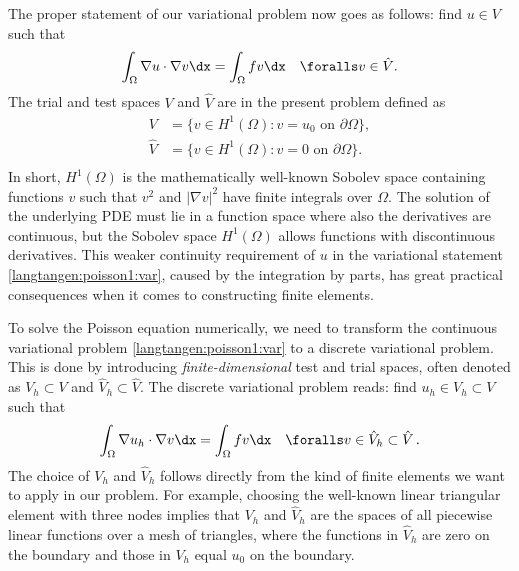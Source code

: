The proper statement of
our variational problem now goes as follows:
find $u \in V$ such that
\begin{equation} \label{langtangen:poisson1:var}
  \int_{\Omega} \nabla u \cdot \nabla v \dx =
  \int_{\Omega} fv \dx
  \quad \foralls v \in \hat{V}.
\end{equation}
The trial and test spaces $V$ and $\hat{V}$ are in the present
problem defined as
\begin{equation}
  \begin{split}
     V      &= \{v \in H^1(\Omega) : v = u_0 \mbox{ on } \partial\Omega\}, \\
    \hat{V} &= \{v \in H^1(\Omega) : v = 0 \mbox{ on } \partial\Omega\}. \\
  \end{split}
\end{equation}
In short, $H^1(\Omega)$ is the mathematically well-known Sobolev space
containing functions $v$ such that $v^2$ and $|\nabla v|^2$ have
finite integrals over $\Omega$. The solution of the underlying PDE
must lie in a function space where also the derivatives are
continuous, but the Sobolev space $H^1(\Omega)$ allows functions with
discontinuous derivatives. This weaker continuity requirement of $u$
in the variational statement \eqref{langtangen:poisson1:var}, caused
by the integration by parts, has great practical consequences when it
comes to constructing finite elements.

To solve the Poisson equation numerically, we need to transform the
continuous variational problem \eqref{langtangen:poisson1:var} to a
discrete variational problem. This is done by introducing
\emph{finite-dimensional} test and trial spaces, often denoted as
$V_h\subset V$ and $\hat{V}_h\subset{\hat{V}}$. The discrete
variational problem reads: find $u_h \in V_h \subset V$ such that
\begin{equation} \label{langtangen:poisson1:vard}
  \int_{\Omega} \nabla u_h \cdot \nabla v \dx =
  \int_{\Omega} fv \dx
  \quad \foralls v \in \hat{V}_h \subset \hat{V}\langtangenep
\end{equation}
The choice of $V_h$ and $\hat{V}_h$ follows directly from the kind of
finite elements we want to apply in our problem. For example, choosing
the well-known linear triangular element with three nodes implies that
$V_h$ and $\hat{V}_h$ are the spaces of all piecewise linear functions
over a mesh of triangles, where the functions in $\hat V_h$ are zero
on the boundary and those in $V_h$ equal $u_0$ on the boundary.

